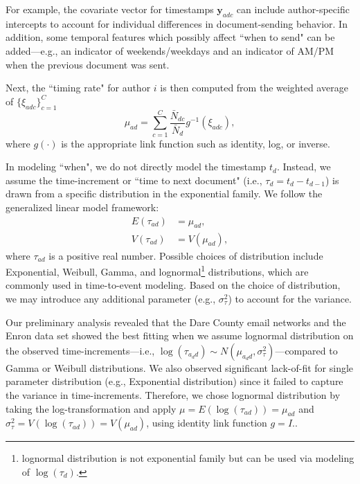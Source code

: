 \documentclass{article}
\begin{document}
For example, the covariate vector for timestamps $\boldsymbol{y}_{adc}$ can include author-specific intercepts to account for individual differences in document-sending behavior. In addition, some temporal features which possibly affect ``when to send" can be added---e.g., an indicator of weekends/weekdays and an indicator of AM/PM when the previous document was sent. 

Next, the ``timing rate" for author $i$ is then computed from the weighted average of $\{\xi_{adc}\}_{c=1}^C$ 
\begin{equation}
\mu_{ad} = \sum_{c=1}^C \frac{\bar N_{dc}}{\bar N_d} g^{-1}(\xi_{adc}),
\end{equation}
where $g(\cdot)$ is the appropriate link function such as identity, log, or inverse. 

In modeling ``when", we do not directly model the timestamp $t_d$. Instead, we assume the time-increment or ``time to next document" (i.e., $\tau_d = t_d-t_{d-1}$) is drawn from a specific distribution in the exponential family.  We follow the generalized linear model framework:
\begin{equation}
\begin{aligned}
E(\tau_{ad}) &= \mu_{ad},\\
V(\tau_{ad}) &= V(\mu_{ad}),
\end{aligned}
\end{equation}
where $\tau_{ad}$ is a positive real number. Possible choices of distribution include Exponential, Weibull, Gamma, and lognormal\footnote{lognormal distribution is not exponential family but can be used via modeling of $\log(\tau_d)$.} distributions, which are commonly used in time-to-event modeling. Based on the choice of distribution, we may introduce any additional parameter (e.g., $\sigma_\tau^2$) to account for the variance.

Our preliminary analysis revealed that the Dare County email networks and the Enron data set showed the best fitting when we assume lognormal distribution on the observed time-increments---i.e., $\log(\tau_{a_dd}) \sim N(\mu_{a_d d}, \sigma^2_\tau)$---compared to Gamma or Weibull distributions. We also observed significant lack-of-fit for single parameter distribution (e.g., Exponential distribution) since it failed to capture the variance in time-increments. Therefore, we chose lognormal distribution by taking the log-transformation and apply $\mu = E(\log(\tau_{ad})) = \mu_{ad}$ and $ \sigma_\tau^2=V(\log(\tau_{ad})) = V(\mu_{ad})$, using identity link function $g = I$.. 
\end{document}
